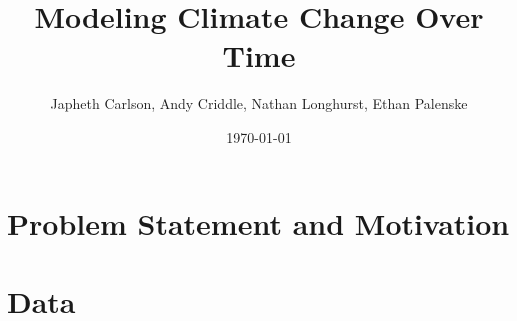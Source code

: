 \documentclass[11pt]{amsart}
\title{Modeling Climate Change Over Time}
\author{Japheth Carlson, Andy Criddle, Nathan Longhurst, Ethan Palenske}
\date{\today} %
\begin{document}
\maketitle %

\begin{abstract}
\end{abstract}

\section{Problem Statement and Motivation}





\section{Data} 
\end{document}
